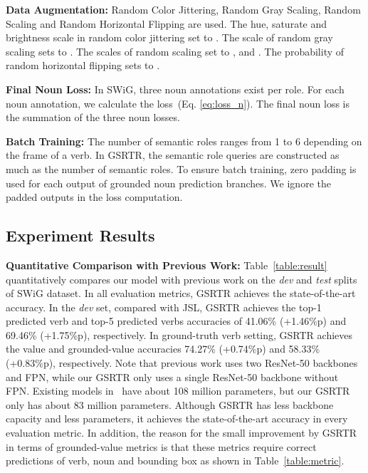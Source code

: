 \noindent\textbf{Data Augmentation:} Random Color Jittering, Random Gray Scaling, Random Scaling and Random Horizontal Flipping are used.
The hue, saturate and brightness scale in random color jittering set to .
The scale of random gray scaling sets to .
The scales of random scaling set to ,  and .
The probability of random horizontal flipping sets to .

\noindent\textbf{Final Noun Loss:} In SWiG, three noun annotations exist per role. For each noun annotation, we calculate the loss~(Eq. \ref{eq:loss_n}). The final noun loss is the summation of the three noun losses. 

\noindent \textbf{Batch Training:} 
The number of semantic roles ranges from 1 to 6 depending on the frame of a verb.
In GSRTR, the semantic role queries are constructed as much as the number of semantic roles.
To ensure batch training, zero padding is used for each output of grounded noun prediction branches. 
We ignore the padded outputs in the loss computation.

\subsection{Experiment Results}
\textbf{Quantitative Comparison with Previous Work:}
Table~\ref{table:result} quantitatively compares our model with previous work on the \emph{dev} and \emph{test} splits of SWiG dataset.
In all evaluation metrics, GSRTR achieves the state-of-the-art accuracy.
In the \emph{dev} set, compared with JSL, GSRTR achieves the top-1 predicted verb and top-5 predicted verbs accuracies of 41.06\% (+1.46\%p) and 69.46\% (+1.75\%p), respectively.
In ground-truth verb setting, GSRTR achieves the value and grounded-value accuracies 74.27\% (+0.74\%p) and 58.33\% (+0.83\%p), respectively.
Note that previous work uses two ResNet-50 backbones and FPN, while our GSRTR only uses a single ResNet-50 backbone without FPN. 
Existing models in~\cite{pratt2020grounded} have about 108 million parameters, but our GSRTR only has about 83 million parameters.
Although GSRTR has less backbone capacity and less parameters, it achieves the state-of-the-art accuracy in every evaluation metric. In addition, the reason for the small improvement by GSRTR in terms of grounded-value metrics is that these metrics require correct predictions of verb, noun and bounding box as shown in Table~\ref{table:metric}.

